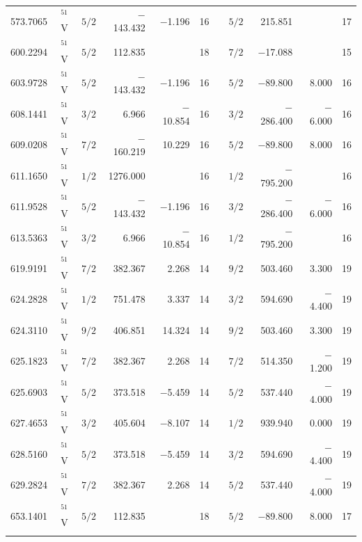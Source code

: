 \documentclass[traditabstract]{aa}
\begin{document}
\begin{center}
\begin{mpsupertabular}{r c@{\hspace{10mm}}c r r ccc r r c}
573.7065 & $^{51}$V  & $5/2$ &  $-$143.432  &   $-$1.196    & 16 && $5/2$  &   215.851&               & 17 \\
600.2294 & $^{51}$V  & $5/2$ &     112.835  &               & 18 && $7/2$  & $-$17.088&               & 15 \\
603.9728 & $^{51}$V  & $5/2$ &  $-$143.432  &   $-$1.196    & 16 && $5/2$  & $-$89.800&    8.000      & 16 \\
608.1441 & $^{51}$V  & $3/2$ &       6.966  &  $-$10.854    & 16 && $3/2$  &$-$286.400& $-$6.000      & 16 \\
609.0208 & $^{51}$V  & $7/2$ &  $-$160.219  &     10.229    & 16 && $5/2$  & $-$89.800&    8.000      & 16 \\
611.1650 & $^{51}$V  & $1/2$ &    1276.000  &               & 16 && $1/2$  &$-$795.200&               & 16 \\
611.9528 & $^{51}$V  & $5/2$ &  $-$143.432  &   $-$1.196    & 16 && $3/2$  &$-$286.400& $-$6.000      & 16 \\
613.5363 & $^{51}$V  & $3/2$ &       6.966  &  $-$10.854    & 16 && $1/2$  &$-$795.200&               & 16 \\
619.9191 & $^{51}$V  & $7/2$ &     382.367  &      2.268    & 14 && $9/2$  &   503.460&    3.300      & 19 \\
624.2828 & $^{51}$V  & $1/2$ &     751.478  &      3.337    & 14 && $3/2$  &   594.690& $-$4.400      & 19 \\
624.3110 & $^{51}$V  & $9/2$ &     406.851  &     14.324    & 14 && $9/2$  &   503.460&    3.300      & 19 \\
625.1823 & $^{51}$V  & $7/2$ &     382.367  &      2.268    & 14 && $7/2$  &   514.350& $-$1.200      & 19 \\
625.6903 & $^{51}$V  & $5/2$ &     373.518  &   $-$5.459    & 14 && $5/2$  &   537.440& $-$4.000      & 19 \\
627.4653 & $^{51}$V  & $3/2$ &     405.604  &   $-$8.107    & 14 && $1/2$  &   939.940&    0.000      & 19 \\
628.5160 & $^{51}$V  & $5/2$ &     373.518  &   $-$5.459    & 14 && $3/2$  &   594.690& $-$4.400      & 19 \\
629.2824 & $^{51}$V  & $7/2$ &     382.367  &      2.268    & 14 && $5/2$  &   537.440& $-$4.000      & 19 \\
653.1401 & $^{51}$V  & $5/2$ &     112.835  &               & 18 && $5/2$  & $-$89.800&    8.000      & 17 \\
   & & & & & & \hspace{6mm} & & & & \\


\end{mpsupertabular}
\end{center}
\end{document}
